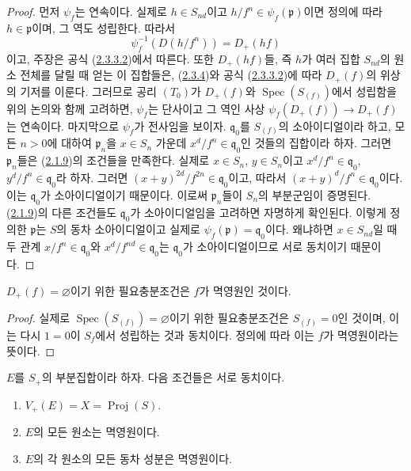 \begin{proof}
먼저 $\psi_f$는 연속이다. 실제로 $h\in S_{nd}$이고
$h/f^n\in\psi_f(\mathfrak{p})$이면 정의에 따라
$h\in\mathfrak{p}$이며, 그 역도 성립한다. 따라서
\[
  \psi_f^{-1}(D(h/f^n))=D_+(hf)
\]
이고, 주장은 공식
(\hyperref[II.2.3.3.2-ko]{2.3.3.2})에서 따른다. 또한 $D_+(hf)$들, 즉
$h$가 여러 집합 $S_{nd}$의 원소 전체를 달릴 때 얻는 이 집합들은,
(\hyperref[II.2.3.4-ko]{2.3.4})와 공식
(\hyperref[II.2.3.3.2-ko]{2.3.3.2})에 따라 $D_+(f)$의 위상의 기저를
이룬다.
그러므로 공리 $(T_0)$가 $D_+(f)$와 $\operatorname{Spec}(S_{(f)})$에서
성립함을 위의 논의와 함께 고려하면, $\psi_f$는 단사이고 그 역인 사상
$\psi_f(D_+(f))\longrightarrow D_+(f)$는 연속이다. 마지막으로
$\psi_f$가 전사임을 보이자. $\mathfrak{q}_0$를 $S_{(f)}$의
소아이디얼이라 하고, 모든 $n>0$에 대하여 $\mathfrak{p}_n$을
$x\in S_n$ 가운데 $x^d/f^n\in\mathfrak{q}_0$인 것들의 집합이라 하자.
그러면 $\mathfrak{p}_n$들은 (\hyperref[II.2.1.9-ko]{2.1.9})의 조건들을
만족한다. 실제로 $x\in S_n$, $y\in S_n$이고
$x^d/f^n\in\mathfrak{q}_0$, $y^d/f^n\in\mathfrak{q}_0$라 하자. 그러면
$(x+y)^{2d}/f^{2n}\in\mathfrak{q}_0$이고, 따라서
$(x+y)^d/f^n\in\mathfrak{q}_0$이다. 이는 $\mathfrak{q}_0$가
소아이디얼이기 때문이다. 이로써
$\mathfrak{p}_n$들이 $S_n$의 부분군임이 증명된다.
(\hyperref[II.2.1.9-ko]{2.1.9})의 다른 조건들도 $\mathfrak{q}_0$가
소아이디얼임을 고려하면 자명하게 확인된다. 이렇게 정의한 $\mathfrak{p}$는 $S$의
동차 소아이디얼이고 실제로
$\psi_f(\mathfrak{p})=\mathfrak{q}_0$이다. 왜냐하면 $x\in S_{nd}$일 때
두 관계 $x/f^n\in\mathfrak{q}_0$와
$x^d/f^{nd}\in\mathfrak{q}_0$는 $\mathfrak{q}_0$가 소아이디얼이므로
서로 동치이기 때문이다.
\end{proof}

\begin{corollary}[2.3.7]
\label{II.2.3.7-ko}
$D_+(f)=\varnothing$이기 위한 필요충분조건은 $f$가 멱영원인 것이다.
\end{corollary}

\begin{proof}
실제로 $\operatorname{Spec}(S_{(f)})=\varnothing$이기 위한 필요충분조건은
$S_{(f)}=0$인 것이며, 이는 다시 $1=0$이 $S_f$에서 성립하는 것과 동치이다.
정의에 따라 이는 $f$가 멱영원이라는 뜻이다.
\end{proof}

\begin{corollary}[2.3.8]
\label{II.2.3.8-ko}
$E$를 $S_+$의 부분집합이라 하자. 다음 조건들은 서로 동치이다.
\begin{enumerate}
  \item[\rm a)] $V_+(E)=X=\operatorname{Proj}(S)$.
  \item[\rm b)] $E$의 모든 원소는 멱영원이다.
  \item[\rm c)] $E$의 각 원소의 모든 동차 성분은 멱영원이다.
\end{enumerate}
\end{corollary}

